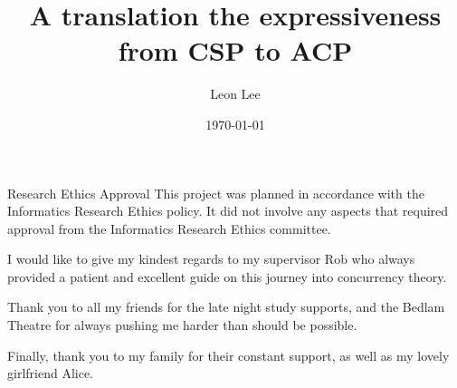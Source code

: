 \documentclass[logo,bsc,singlespacing,parskip,online]{infthesis}
\begin{document}
\begin{preliminary}

\title{A translation the expressiveness from CSP to ACP}

\author{Leon Lee}
\date{\today}


\maketitle

\newenvironment{ethics}
   {\begin{frontenv}{Research Ethics Approval}{\LARGE}}
   {\end{frontenv}\newpage}

\begin{ethics}
This project was planned in accordance with the Informatics Research
Ethics policy. It did not involve any aspects that required approval
from the Informatics Research Ethics committee.

\standarddeclaration
\end{ethics}


\begin{acknowledgements}
   I would like to give my kindest regards to my supervisor Rob who always provided a patient and excellent guide on this journey into concurrency theory.

   Thank you to all my friends for the late night study supports, and the Bedlam Theatre for always pushing me harder than should be possible.

   Finally, thank you to my family for their constant support, as well as my lovely girlfriend Alice.
\end{acknowledgements}

\end{preliminary}
\end{document}
